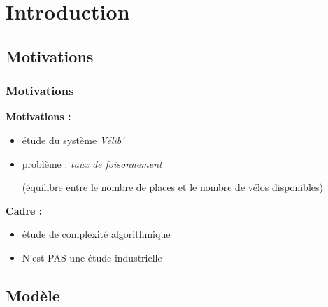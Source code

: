 \section{Introduction}

\subsection{Motivations}

\begin{frame}[label=Motivations]
  \frametitle{Motivations}
  
  \textbf{Motivations :}
  \begin{itemize}
  \item étude du système \emph{Vélib'}
  \item problème : \emph{taux de foisonnement}
  
  (équilibre entre le nombre de places et le nombre de vélos disponibles)
  \end{itemize}
  
  \vfill
  \textbf{Cadre :}
  \begin{itemize}
  \item étude de complexité algorithmique
  \item N'est PAS une étude industrielle
  \end{itemize}

\end{frame}


\subsection{Modèle}

